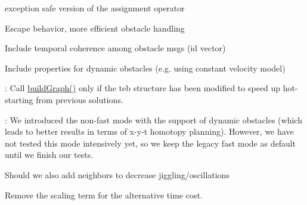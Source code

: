 
\begin{DoxyRefList}
\item[全局 \mbox{\hyperlink{classteb__local__planner_1_1PoseSE2_a49e25c8aaa6ee8db42f5463694bddaf3}{teb\+\_\+local\+\_\+planner\+::Pose\+SE2\+::operator=}} (const \mbox{\hyperlink{classteb__local__planner_1_1PoseSE2}{Pose\+SE2}} \&rhs)]\label{todo__todo000005}%
%
exception safe version of the assignment operator  
\item[类 \mbox{\hyperlink{classteb__local__planner_1_1TebLocalPlannerROS}{teb\+\_\+local\+\_\+planner\+::Teb\+Local\+Planner\+ROS}} ]\label{todo__todo000006}%
%
Escape behavior, more efficient obstacle handling  
\item[全局 \mbox{\hyperlink{classteb__local__planner_1_1TebLocalPlannerROS_ac4340c638b3411325361d066b86533af}{teb\+\_\+local\+\_\+planner\+::Teb\+Local\+Planner\+ROS\+::update\+Obstacle\+Container\+With\+Costmap}} ()]\label{todo__todo000007}%
%
Include temporal coherence among obstacle msgs (id vector) 

Include properties for dynamic obstacles (e.\+g. using constant velocity model)  
\item[类 \mbox{\hyperlink{classteb__local__planner_1_1TebOptimalPlanner}{teb\+\_\+local\+\_\+planner\+::Teb\+Optimal\+Planner}} ]\label{todo__todo000001}%
%
\+: Call \mbox{\hyperlink{classteb__local__planner_1_1TebOptimalPlanner_a2b9ad598cec60b56906806603fa45497}{build\+Graph()}} only if the teb structure has been modified to speed up hot-\/starting from previous solutions. 

\+: We introduced the non-\/fast mode with the support of dynamic obstacles (which leads to better results in terms of x-\/y-\/t homotopy planning). However, we have not tested this mode intensively yet, so we keep the legacy fast mode as default until we finish our tests.  
\item[全局 \mbox{\hyperlink{classteb__local__planner_1_1TebOptimalPlanner_a0361f9f5c2fb8cd561cdf1b34db9a32b}{teb\+\_\+local\+\_\+planner\+::Teb\+Optimal\+Planner\+::Add\+Edges\+Dynamic\+Obstacles}} (double weight\+\_\+multiplier=1.\+0)]\label{todo__todo000004}%
%
Should we also add neighbors to decrease jiggling/oscillations  
\item[全局 \mbox{\hyperlink{classteb__local__planner_1_1TebOptimalPlanner_af1821ce3262ce2c607d482b40eccaa57}{teb\+\_\+local\+\_\+planner\+::Teb\+Optimal\+Planner\+::compute\+Current\+Cost}} (double obst\+\_\+cost\+\_\+scale=1.\+0, double viapoint\+\_\+cost\+\_\+scale=1.\+0, bool alternative\+\_\+time\+\_\+cost=false)]\label{todo__todo000002}%
%
Remove the scaling term for the alternative time cost. 


\end{DoxyRefList}
